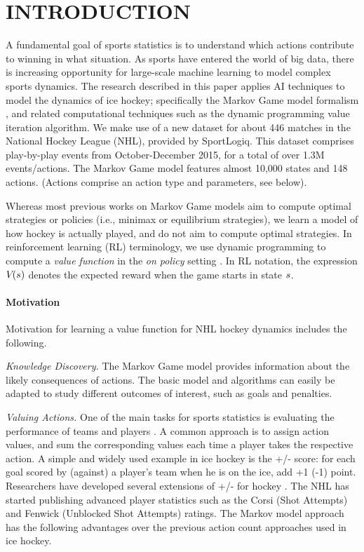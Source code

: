 \section{INTRODUCTION}

A fundamental goal of sports statistics is to understand which actions contribute to winning in what situation. As sports have entered the world of big data, there is increasing opportunity for large-scale machine learning to model complex sports dynamics. The research described in this paper applies AI techniques to model the dynamics of ice  hockey; specifically the Markov Game model formalism \citep{Littman1994}, and related computational techniques such as the dynamic programming value iteration algorithm. We make use of a new dataset for about 446 matches in the National  Hockey League (NHL), provided by SportLogiq. This dataset comprises play-by-play events from October-December 2015, for a total of over 1.3M events/actions.
The Markov Game model features almost 10,000 states and 148 actions. (Actions comprise an action type and parameters, see below). 

Whereas most previous works on Markov Game models aim to compute optimal strategies or policies \citep{Littman1994} (i.e., minimax or equilibrium strategies), we learn a model of how hockey is actually played, and do not aim to compute optimal strategies. In reinforcement learning (RL) terminology, we use dynamic programming to compute a {\em value function} in the {\em on policy} setting \citep{bib:sutton}. In RL notation, the expression $V_{}(s)$ denotes the expected reward when the game starts in state $s$.

\paragraph{Motivation}
Motivation for learning a value function for NHL hockey dynamics includes the following.

{\em Knowledge Discovery.} The Markov Game model provides information about the likely consequences of actions. The basic model and algorithms can easily be adapted to study different outcomes of interest, such as goals and penalties.

{\em Valuing Actions.} One of the main tasks for sports statistics is evaluating the performance of teams and players \citep{Schumaker2010}.
A common approach is to assign action values, and sum the corresponding values each time a player takes the respective action.
 A simple and widely used example in ice hockey is the +/- score: for each goal scored by (against) a player's team when he is on the ice, add +1 (-1) point. Researchers have developed several extensions of +/- for hockey \citep{Macdonald2011a,Spagnola2013,Schuckers2013}. The NHL has started publishing advanced player statistics such as the Corsi (Shot Attempts) and Fenwick (Unblocked Shot Attempts) ratings. %
The Markov model approach has the following advantages over the previous action count approaches used in ice hockey. 

